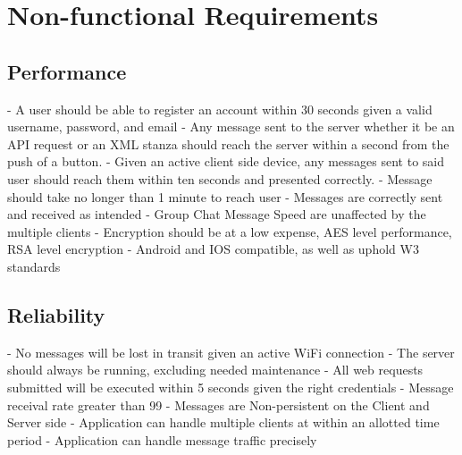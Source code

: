 \documentclass[11pt]{article}
\theoremstyle{plain}
\theoremstyle{definition}
\begin{document}
\section{Non-functional Requirements}\label{sec:nonfuncrequirements}
\subsection{Performance}
- A user should be able to register an account within 30 seconds given a valid username, 
  password, and email
\newline
- Any message sent to the server whether it be an API request or an XML stanza should reach 
  the server within a second from the push of a button.
\newline
- Given an active client side device, any messages sent to said user should reach them 
  within ten seconds and presented correctly. \newline
- Message should take no longer than 1 minute to reach user \newline
- Messages are correctly sent and received as intended \newline
- Group Chat Message Speed are unaffected by the multiple clients \newline
- Encryption should be at a low expense, AES level performance, RSA level encryption \newline
- Android and IOS compatible, as well as uphold W3 standards

\subsection{Reliability}
- No messages will be lost in transit given an active WiFi connection
  \newline
- The server should always be running, excluding needed maintenance
  \newline
- All web requests submitted will be executed within 5 seconds given the right 
  credentials
    \newline
- Message receival rate greater than 99 \newline 
- Messages are Non-persistent on the Client and Server side \newline
- Application can handle multiple clients at within an allotted time period \newline
- Application can handle message traffic precisely \newline
\end{document}
